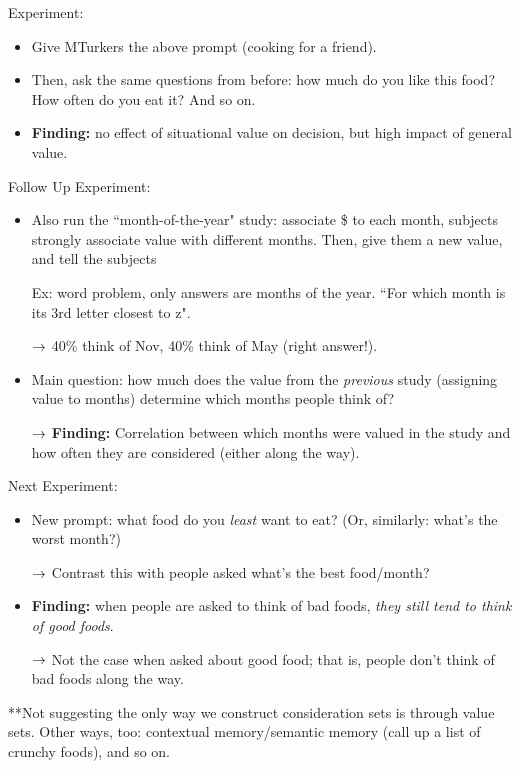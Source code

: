 Experiment:
\begin{itemize}
    \item Give MTurkers the above prompt (cooking for a friend).
    \item Then, ask the same questions from before: how much do you like this food? How often do you eat it? And so on.
    \item {\bf Finding:} no effect of situational value on decision, but high impact of general value.
\end{itemize}

Follow Up Experiment:
\begin{itemize}
    \item Also run the ``month-of-the-year" study: associate \$ to each month, subjects strongly associate value with different months. Then, give them a new value, and tell the subjects 
    
    Ex: word problem, only answers are months of the year. ``For which month is its 3rd letter closest to z".
    
    $\rightarrow$ 40\% think of Nov, 40\% think of May (right answer!).
    
    \item Main question: how much does the value from the {\it previous} study (assigning value to months) determine which months people think of?
    
    $\rightarrow$ {\bf Finding:} Correlation between which months were valued in the study and how often they are considered (either along the way).
\end{itemize}


Next Experiment:
\begin{itemize}
    \item New prompt: what food do you {\it least} want to eat? (Or, similarly: what's the worst month?)
    
    $\rightarrow$ Contrast this with people asked what's the best food/month?
    
    \item {\bf Finding:} when people are asked to think of bad foods, {\it they still tend to think of good foods}.
    
    $\rightarrow$ Not the case when asked about good food; that is, people don't think of bad foods along the way.
\end{itemize}

**Not suggesting the only way we construct consideration sets is through value sets. Other ways, too: contextual memory/semantic memory (call up a list of crunchy foods), and so on. \\

